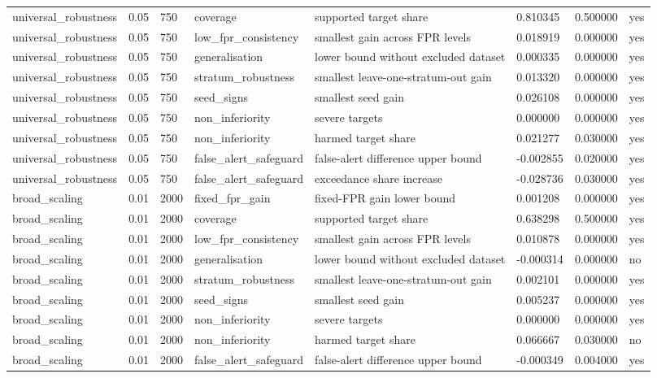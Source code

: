 \begin{tabular}{llllllll}
universal\_robustness & 0.05 & 750 & coverage & supported target share & 0.810345 & 0.500000 & yes \\
universal\_robustness & 0.05 & 750 & low\_fpr\_consistency & smallest gain across FPR levels & 0.018919 & 0.000000 & yes \\
universal\_robustness & 0.05 & 750 & generalisation & lower bound without excluded dataset & 0.000335 & 0.000000 & yes \\
universal\_robustness & 0.05 & 750 & stratum\_robustness & smallest leave-one-stratum-out gain & 0.013320 & 0.000000 & yes \\
universal\_robustness & 0.05 & 750 & seed\_signs & smallest seed gain & 0.026108 & 0.000000 & yes \\
universal\_robustness & 0.05 & 750 & non\_inferiority & severe targets & 0.000000 & 0.000000 & yes \\
universal\_robustness & 0.05 & 750 & non\_inferiority & harmed target share & 0.021277 & 0.030000 & yes \\
universal\_robustness & 0.05 & 750 & false\_alert\_safeguard & false-alert difference upper bound & -0.002855 & 0.020000 & yes \\
universal\_robustness & 0.05 & 750 & false\_alert\_safeguard & exceedance share increase & -0.028736 & 0.030000 & yes \\
broad\_scaling & 0.01 & 2000 & fixed\_fpr\_gain & fixed-FPR gain lower bound & 0.001208 & 0.000000 & yes \\
broad\_scaling & 0.01 & 2000 & coverage & supported target share & 0.638298 & 0.500000 & yes \\
broad\_scaling & 0.01 & 2000 & low\_fpr\_consistency & smallest gain across FPR levels & 0.010878 & 0.000000 & yes \\
broad\_scaling & 0.01 & 2000 & generalisation & lower bound without excluded dataset & -0.000314 & 0.000000 & no \\
broad\_scaling & 0.01 & 2000 & stratum\_robustness & smallest leave-one-stratum-out gain & 0.002101 & 0.000000 & yes \\
broad\_scaling & 0.01 & 2000 & seed\_signs & smallest seed gain & 0.005237 & 0.000000 & yes \\
broad\_scaling & 0.01 & 2000 & non\_inferiority & severe targets & 0.000000 & 0.000000 & yes \\
broad\_scaling & 0.01 & 2000 & non\_inferiority & harmed target share & 0.066667 & 0.030000 & no \\
broad\_scaling & 0.01 & 2000 & false\_alert\_safeguard & false-alert difference upper bound & -0.000349 & 0.004000 & yes \\

\end{tabular}
